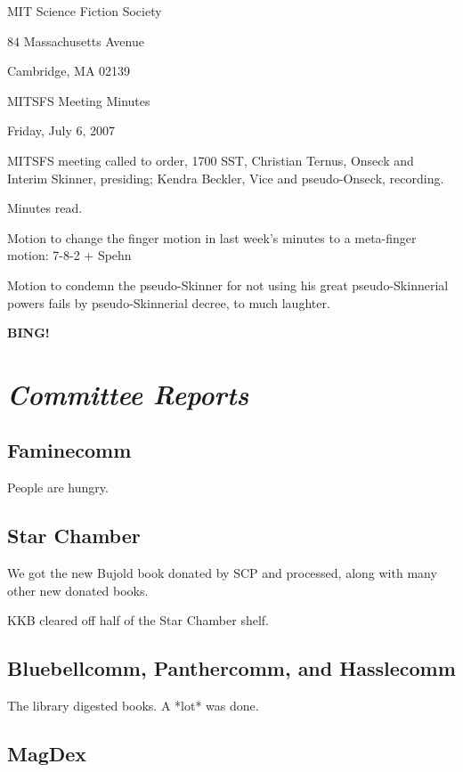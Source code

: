 \documentclass[10pt]{article}
\newcommand{\bing}{{\bf BING!} }
\newcommand{\goto}[1]{\bing \vskip 12pt \section*{{\em{#1}}}}
\begin{document}
\begin{center}

MIT Science Fiction Society

84 Massachusetts Avenue

Cambridge, MA 02139

\vspace{12pt}

MITSFS Meeting Minutes

Friday, July 6, 2007

\end{center}

\vspace{18pt}

\setlength{\parskip}{6pt}

\noindent
MITSFS meeting called to order, 1700 SST,
Christian Ternus, Onseck and Interim Skinner, presiding; Kendra Beckler, Vice and pseudo-Onseck, recording.

Minutes read.

Motion to change the finger motion in last week's minutes to a meta-finger motion: 7-8-2 + Spehn

Motion to condemn the pseudo-Skinner for not using his great pseudo-Skinnerial powers fails by pseudo-Skinnerial decree, to much laughter.

\goto{Committee Reports}

\subsection*{Faminecomm}

People are hungry.

\subsection*{Star Chamber}

We got the new Bujold book donated by SCP and processed, along with many other new donated books.

KKB cleared off half of the Star Chamber shelf.

\subsection*{Bluebellcomm, Panthercomm, and Hasslecomm}

The library digested books.  A *lot* was done.

\subsection*{MagDex}
\end{document}
